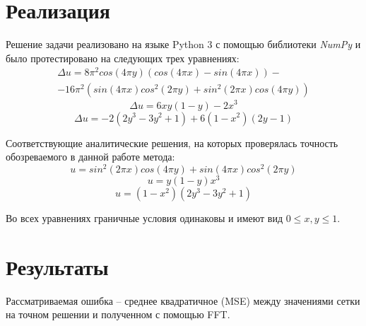 \documentclass[a4paper,12pt]{article}
\theoremstyle{plain} %
\theoremstyle{definition} %
\theoremstyle{remark} %
\theoremstyle{definition}
\theoremstyle{definition}
\begin{document}
	\section{Реализация}
		Решение задачи реализовано на языке Python 3 с помощью библиотеки \textit{NumPy} и было протестировано на следующих трех уравнениях:
		\begin{multline}
			\Delta u=8\pi^{2}cos(4\pi y)(cos(4\pi x)-sin(4\pi x))- \\
			-16\pi^{2}(sin(4\pi x)cos^{2}(2\pi y)+sin^{2}(2\pi x)cos(4\pi y))
		\end{multline}
		\begin{equation}
		\Delta u=6xy(1-y)-2x^{3}
		\end{equation}
		\begin{equation}
		\Delta u=-2(2y^{3}-3y^{2}+1)+6(1-x^{2})(2y-1)
		\end{equation}
		\medskip
		
		Соответствующие аналитические решения, на которых проверялась точность обозреваемого в данной работе метода:
		\begin{equation*}
		 u=sin^{2}(2\pi x)cos(4\pi y)+sin(4\pi x)cos^{2}(2\pi y)
		\end{equation*}
		\begin{equation*}
		 u=y(1-y)x^{3}
		\end{equation*}
		\begin{equation*}
		 u=(1-x^{2})(2y^{3}-3y^{2}+1)
		\end{equation*}
		
		Во всех уравнениях граничные условия одинаковы и имеют вид $0\le x,y\le 1.$
	
	
	\section{Результаты}
	Рассматриваемая ошибка -- среднее квадратичное (MSE) между значениями сетки на точном решении и полученном с помощью FFT.
	
\end{document}
